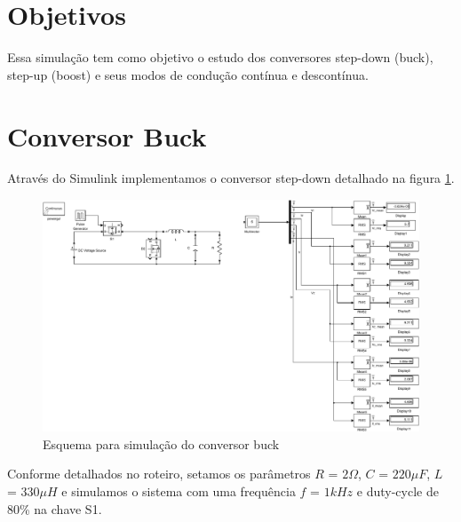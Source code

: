 \documentclass{article}
\begin{document}


\onehalfspacing
\section{Objetivos}
	Essa simulação tem como objetivo o estudo dos conversores step-down (buck), step-up (boost) e seus modos de condução contínua e descontínua.
	 
\section{Conversor Buck}
Através do Simulink implementamos o conversor step-down detalhado na figura \ref{fig:bsim}.
\begin{figure}[H]
	\centering
	\includegraphics[width=\linewidth]{matlab/buck/bsim}
	\caption{Esquema para simulação do conversor buck}
	\label{fig:bsim}
\end{figure}
Conforme detalhados no roteiro, setamos os parâmetros $R$ = $2\Omega$, $C$ = $220\mu F$, $L$ = $330\mu H$ e simulamos o sistema com uma frequência $f$ = $1kHz$ e duty-cycle de 80\% na chave S1.
\end{document}
